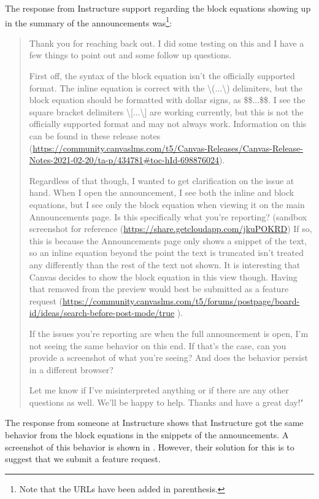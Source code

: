 The response from Instructure support regarding the block equations showing up in the summary of the announcements was\footnote{Note that the URLs have been added in parenthesis.}:
\begin{quote}
Thank you for reaching back out.  I did some testing on this and I have a few things to point out and some follow up questions.

First off, the syntax of the block equation isn't the officially supported format.  The inline equation is correct with the \textbackslash(...\textbackslash) delimiters, but the block equation should be formatted with dollar signs, as \$\$...\$\$.  I see the square bracket delimiters \textbackslash[...\textbackslash] are working currently, but this is not the officially supported format and may not always work.  Information on this can be found in these release notes (\url{https://community.canvaslms.com/t5/Canvas-Releases/Canvas-Release-Notes-2021-02-20/ta-p/434781\#toc-hId-698876024}).

Regardless of that though, I wanted to get clarification on the issue at hand.  When I open the announcement, I see both the inline and block equations, but I see only the block equation when viewing it on the main Announcements page.  Is this specifically what you're reporting?  (sandbox screenshot for reference (\url{https://share.getcloudapp.com/jkuPOKRD})  If so, this is because the Announcements page only shows a snippet of the text, so an inline equation beyond the point the text is truncated isn't treated any differently than the rest of the text not shown.  It is interesting that Canvas decides to show the block equation in this view though.  Having that removed from the preview would best be submitted as a feature request (\url{https://community.canvaslms.com/t5/forums/postpage/board-id/ideas/search-before-post-mode/true} ).

If the issues you're reporting are when the full announcement is open, I'm not seeing the same behavior on this end.  If that's the case, can you provide a screenshot of what you're seeing?  And does the behavior persist in a different browser?

Let me know if I've misinterpreted anything or if there are any other questions as well.  We'll be happy to help.  Thanks and have a great day!"
\end{quote}

The response from someone at Instructure shows that Instructure got the same behavior from the block equations in the snippets of the announcements.  A screenshot of this behavior is shown in . However, their solution for this is to suggest that we submit a feature request. 

